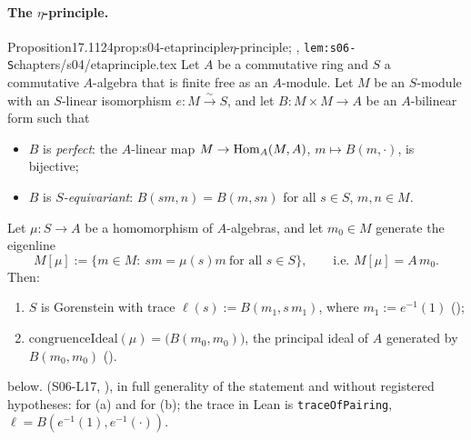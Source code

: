 \paragraph{The $\eta$-principle.}
\begin{quoted}{Proposition}{17.1}{124}{prop:s04-etaprinciple}{$\eta$-principle; , \texttt{lem:s06-S}}{chapters/s04/etaprinciple.tex}\label{rpt:prop:s04-etaprinciple}
Let $A$ be a commutative ring and $S$ a commutative $A$-algebra that is finite free as an $A$-module. Let $M$ be an $S$-module with an
$S$-linear isomorphism $e:M\xrightarrow{\sim}S$, and let $B:M\times M\to A$ be an $A$-bilinear form such that
\begin{itemize}
\item $B$ is \emph{perfect}: the $A$-linear map $M\to\operatorname{Hom}_A(M,A)$, $m\mapsto B(m,\cdot)$, is bijective;
\item $B$ is \emph{$S$-equivariant}: $B(sm,n)=B(m,sn)$ for all $s\in S$, $m,n\in M$.
\end{itemize}
Let $\mu:S\to A$ be a homomorphism of $A$-algebras, and let $m_0\in M$ generate the eigenline
\[M[\mu]:=\{m\in M:\ sm=\mu(s)m\ \text{for all }s\in S\},\qquad\text{i.e.\ }M[\mu]=A\,m_0.\]
Then:
\begin{enumerate}[label=(\alph*)]
\item $S$ is Gorenstein with trace $\ell(s):=B(m_1,s\,m_1)$, where $m_1:=e^{-1}(1)$ ();
\item $\mathrm{congruenceIdeal}(\mu)=\big(B(m_0,m_0)\big)$, the principal ideal of $A$ generated by $B(m_0,m_0)$
  ().
\end{enumerate}
\stproved{} below. \stformal{} (S06-L17, ), in full generality of the statement and without registered hypotheses:  for (a) and  for (b); the trace in Lean is \texttt{traceOfPairing}, $\ell=B(e^{-1}(1),e^{-1}(\cdot))$.
\end{quoted}
